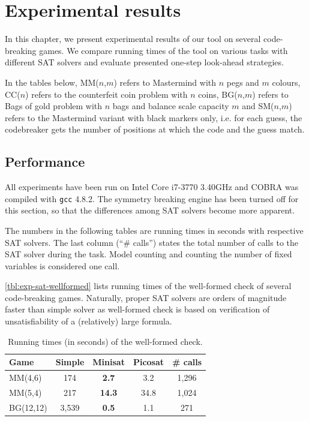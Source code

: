\chapter{Experimental results}

In this chapter, we present experimental results of our tool on several code-breaking games.
We compare running times of the tool on various tasks with different SAT solvers and
  evaluate presented one-step look-ahead strategies.

In the tables below, MM($n$,$m$) refers to Mastermind with $n$ pegs and $m$ colours,
CC($n$) refers to the counterfeit coin problem with $n$ coins,
BG($n$,$m$) refers to Bags of gold problem with $n$ bags and balance scale capacity $m$ and
SM($n$,$m$) refers to the Mastermind variant with black markers only, i.e.
  for each guess, the codebreaker gets the number of positions at which the code
  and the guess match.

\section{Performance}

All experiments have been run on Intel Core i7-3770 3.40GHz and COBRA was
compiled with \texttt{gcc} 4.8.2.
The symmetry breaking engine has been turned off for this section,
  so that the differences among SAT solvers become more apparent.

The numbers in the following tables are running times in seconds with
  respective SAT solvers.
The last column (``\# calls'') states the total number of calls to
  the SAT solver during the task.
Model counting and counting the number of fixed variables is considered one call.

\autoref{tbl:exp-sat-wellformed} lists running times of the well-formed check
  of several code-breaking games.
Naturally, proper SAT solvers are orders of magnitude faster than simple solver
as well-formed check is based on verification of unsatisfiability of
  a (relatively) large formula.

\begin{table}[h]
\begin{center}
\begin{tabular}{|l|c|c|c|c|} \hline
Game & Simple & Minisat & Picosat  & \# calls \\ \hline
MM(4,6) & 174 & \textbf{2.7} & 3.2 & 1,296 \\
MM(5,4) & 217 & \textbf{14.3} & 34.8 & 1,024 \\
BG(12,12) & 3,539 &  \textbf{0.5} & 1.1 & 271 \\\hline
\end{tabular}
\caption{Running times (in seconds) of the well-formed check.}
\label{tbl:exp-sat-wellformed}
\end{center}
\end{table}

